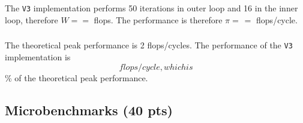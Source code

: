 \subsubsection{} %
The \texttt{V3} implementation performs 50 iterations in outer loop and 16 in the inner loop, therefore $W = = $ flops. The performance is therefore $\pi = \frac{}{} = $ flops/cycle.
\subsubsection{} %
The theoretical peak performance is 2 flops/cycles. The performance of the \texttt{V3} implementation is $$ flops/cycle, which is $$\% of the theoretical peak performance.

\subsection{Microbenchmarks (40 pts)}
\subsubsection{} %

\subsubsection{} %

\subsubsection{} %
